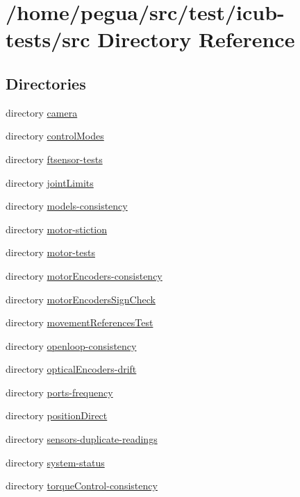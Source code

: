 \section{/home/pegua/src/test/icub-\/tests/src Directory Reference}
\label{dir_68267d1309a1af8e8297ef4c3efbcdba}
\subsection*{Directories}
\begin{DoxyCompactItemize}
\item 
directory \hyperlink{dir_34519bff5ae72130fe71a8620cbf1fc0}{camera}
\item 
directory \hyperlink{dir_67a6d6fd93427d49c4a56e9e89568513}{control\-Modes}
\item 
directory \hyperlink{dir_58c9f48d72e7737305eca65c820f5d4c}{ftsensor-\/tests}
\item 
directory \hyperlink{dir_52bb83cdfa78eea1d57abbea3c8e3d28}{joint\-Limits}
\item 
directory \hyperlink{dir_6355ee7e8e7fccbf90712e6e68524328}{models-\/consistency}
\item 
directory \hyperlink{dir_3b1318bac6af3327e49b6f2c90562c86}{motor-\/stiction}
\item 
directory \hyperlink{dir_5eba7e4699fbf6bf477756242c12a311}{motor-\/tests}
\item 
directory \hyperlink{dir_ff120bfd69174aceba0b7c2c1b4a03e3}{motor\-Encoders-\/consistency}
\item 
directory \hyperlink{dir_7afe760acf634ae748bef9bf87f73d01}{motor\-Encoders\-Sign\-Check}
\item 
directory \hyperlink{dir_1ff6e3a7912c7481e100b734d4f6c773}{movement\-References\-Test}
\item 
directory \hyperlink{dir_f9de59b413a1f1ae04ea264c82cc2719}{openloop-\/consistency}
\item 
directory \hyperlink{dir_7f61241abd7fbdf9954805296c6d0bed}{optical\-Encoders-\/drift}
\item 
directory \hyperlink{dir_d6cc1804077fb7a0bee471bebe09c948}{ports-\/frequency}
\item 
directory \hyperlink{dir_de7c96bd180ef87bf5425ed419472c36}{position\-Direct}
\item 
directory \hyperlink{dir_6fc1adc4fe0a69d5cc9f87dc6006118e}{sensors-\/duplicate-\/readings}
\item 
directory \hyperlink{dir_22920df90588b6b2fe85332a8ebd338b}{system-\/status}
\item 
directory \hyperlink{dir_ea8250e1e424defa140420a75e35c564}{torque\-Control-\/consistency}
\end{DoxyCompactItemize}
